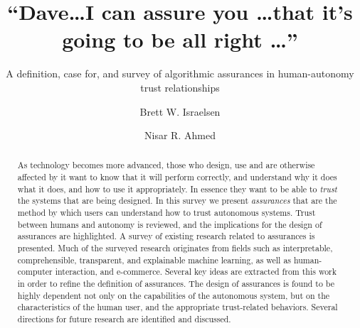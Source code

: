 \documentclass[format=manuscript,review=true]{acmart}
\begin{document}
\title{``Dave\ldots I can assure you \ldots that it's going to be all right \ldots''} 
 \subtitle{A definition, case for, and survey of algorithmic assurances in human-autonomy trust relationships}
\author{Brett W. Israelsen}
\author{Nisar R. Ahmed}

\begin{abstract}
    As technology becomes more advanced, those who design, use and are otherwise affected by it want to know that it will perform correctly, and understand why it does what it does, and how to use it appropriately. In essence they want to be able to \emph{trust} the systems that are being designed. In this survey we present \emph{assurances} that are the method by which users can understand how to trust autonomous systems. Trust between humans and autonomy is reviewed, and the implications for the design of assurances are highlighted. A survey of existing research related to assurances is presented. Much of the surveyed research originates from fields such as interpretable, comprehensible, transparent, and explainable machine learning, as well as human-computer interaction, and e-commerce. Several key ideas are extracted from this work in order to refine the definition of assurances. The design of assurances is found to be highly dependent not only on the capabilities of the autonomous system, but on the characteristics of the human user, and the appropriate trust-related behaviors. Several directions for future research are identified and discussed.
\end{abstract}
\end{document}
